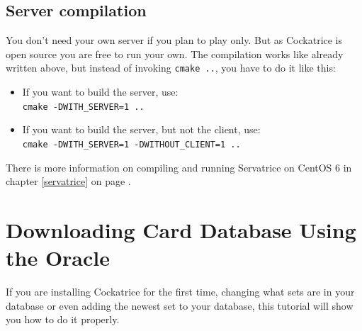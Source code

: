 \documentclass[a4paper]{scrbook}
\newcommand{\shellcmd}[1]{\texttt{\scriptsize #1}}
\begin{document}
\subsection{Server compilation}
You don't need your own server if you plan to play only. But as Cockatrice is open source you are free to run your own.
The compilation works like already written above, but instead of invoking \shellcmd{cmake ..}, you have to do it like this:
\begin{itemize}
 \item If you want to build the server, use:\\ \shellcmd{cmake -DWITH\_SERVER=1 ..}
 \item If you want to build the server, but not the client, use:\\ \shellcmd{cmake -DWITH\_SERVER=1 -DWITHOUT\_CLIENT=1 ..}
\end{itemize}
There is more information on compiling and running Servatrice on CentOS 6 in chapter \ref{servatrice} on page \pageref{servatrice}.

\section{Downloading Card Database Using the Oracle}
If you are installing Cockatrice for the first time, changing what sets are in your database or even adding the newest set to your database, this tutorial will show you how to do it properly.
\end{document}
